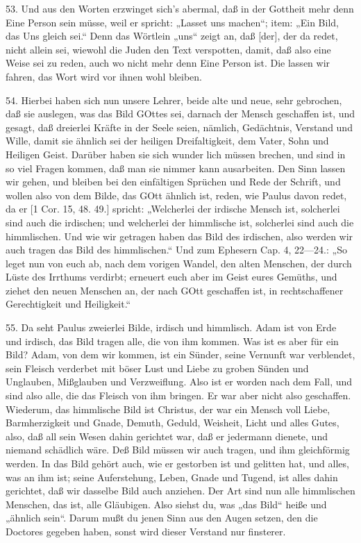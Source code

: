 53. Und aus den Worten erzwinget sich's abermal, daß in der Gottheit mehr denn Eine Person sein müsse, weil er spricht: „Lasset uns machen“; item: „Ein Bild, das Uns gleich sei.“ Denn das Wörtlein „uns“ zeigt an, daß [der], der da redet, nicht allein sei, wiewohl die Juden den Text verspotten, damit, daß also eine Weise sei zu reden, auch wo nicht mehr denn Eine Person ist. Die lassen wir fahren, das Wort wird vor ihnen wohl bleiben.

54. Hierbei haben sich nun unsere Lehrer, beide alte und neue, sehr gebrochen, daß sie auslegen, was das Bild GOttes sei, darnach der Mensch geschaffen ist, und gesagt, daß dreierlei Kräfte in der Seele seien, nämlich, Gedächtnis, Verstand und Wille, damit sie ähnlich sei der heiligen Dreifaltigkeit, dem Vater, Sohn und Heiligen Geist. Darüber haben sie sich wunder
lich müssen brechen, und sind in so viel Fragen kommen, daß man sie nimmer kann ausarbeiten. Den Sinn lassen wir gehen, und bleiben bei den einfältigen Sprüchen und Rede der Schrift, und wollen also von dem Bilde, das GOtt ähnlich ist, reden, wie Paulus davon redet, da er [1 Cor. 15, 48. 49.] spricht: „Welcherlei der irdische Mensch ist, solcherlei sind auch die irdischen; und welcherlei der himmlische ist, solcherlei sind auch die himmlischen. Und wie wir getragen haben das Bild des irdischen, also werden wir auch tragen das Bild des himmlischen.“ Und zum Ephesern Cap. 4, 22—24.: „So leget nun von euch ab, nach dem vorigen Wandel, den alten Menschen, der durch Lüste des Irrthums verdirbt; erneuert euch aber im Geist eures Gemüths, und ziehet den neuen Menschen an, der nach GOtt geschaffen ist, in rechtschaffener Gerechtigkeit und Heiligkeit.“

55. Da seht Paulus zweierlei Bilde, irdisch und himmlisch. Adam ist von Erde und irdisch, das Bild tragen alle, die von ihm kommen. Was ist es aber für ein Bild? Adam, von dem wir kommen, ist ein Sünder, seine Vernunft war verblendet, sein Fleisch verderbet mit böser Lust und Liebe zu groben Sünden und Unglauben, Mißglauben und Verzweiflung. Also ist er worden nach dem Fall, und sind also alle, die das Fleisch von ihm bringen. Er war aber nicht also geschaffen. Wiederum, das himmlische Bild ist Christus, der war ein Mensch voll Liebe, Barmherzigkeit und Gnade, Demuth, Geduld, Weisheit, Licht und alles Gutes, also, daß all sein Wesen dahin gerichtet war, daß er jedermann dienete, und niemand schädlich wäre. Deß Bild müssen wir auch tragen, und ihm gleichförmig werden. In das Bild gehört auch, wie er gestorben ist und gelitten hat, und alles, was an ihm ist; seine Auferstehung, Leben, Gnade und Tugend, ist alles dahin gerichtet, daß wir dasselbe Bild auch anziehen. Der Art sind nun alle himmlischen Menschen, das ist, alle Gläubigen. Also siehst du, was „das Bild“ heiße und „ähnlich sein“. Darum mußt du jenen Sinn aus den Augen setzen, den die Doctores gegeben haben, sonst wird dieser Verstand nur finsterer.

